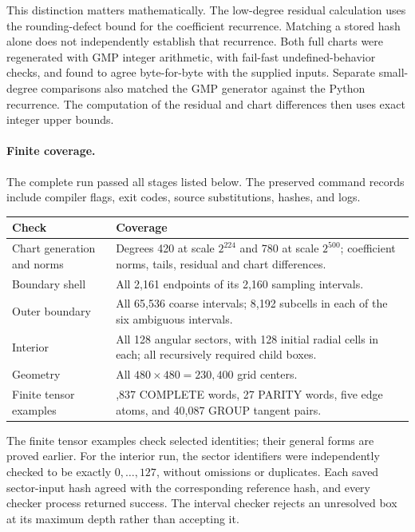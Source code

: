 \documentclass[11pt]{article}
\numberwithin{equation}{section}
\theoremstyle{definition}
\theoremstyle{remark}
\begin{document}
This distinction matters mathematically.  The low-degree residual calculation
uses the rounding-defect bound for the coefficient recurrence.  Matching a
stored hash alone does not independently establish that recurrence.  Both full
charts were regenerated with GMP integer arithmetic, with fail-fast
undefined-behavior checks, and found to agree
byte-for-byte with the supplied inputs.  Separate small-degree comparisons also
matched the GMP generator against the Python recurrence.  The computation of
the residual and chart differences then uses exact integer upper bounds.

\paragraph{Finite coverage.}
The complete run passed all stages listed below.  The preserved command records
include compiler flags, exit codes, source substitutions, hashes, and logs.
\begin{center}
\begin{tabular}{@{}>{\raggedright\arraybackslash}p{.29\linewidth}>{\raggedright\arraybackslash}p{.65\linewidth}@{}}
\toprule
Check & Coverage \\
\midrule
Chart generation and norms & Degrees 420 at scale $2^{224}$ and 780 at scale
$2^{500}$; coefficient norms, tails, residual and chart differences. \\
Boundary shell & All 2,161 endpoints of its 2,160 sampling intervals. \\
Outer boundary & All 65,536 coarse intervals; 8,192 subcells in each of the
six ambiguous intervals. \\
Interior & All 128 angular sectors, with 128 initial radial cells in each;
all recursively required child boxes. \\
Geometry & All $480\times480=230{,}400$ grid centers. \\
Finite tensor examples & 9,837 COMPLETE words, 27 PARITY words, five edge
atoms, and 40,087 GROUP tangent pairs. \\
\bottomrule
\end{tabular}
\end{center}
The finite tensor examples check selected identities; their general forms are
proved earlier.  For the interior run, the sector identifiers were independently
checked to be exactly $0,\ldots,127$, without omissions or duplicates.  Each saved
sector-input hash agreed with the corresponding reference hash, and every
checker process returned success.  The interval checker rejects an unresolved
box at its maximum depth rather than accepting it.
\end{document}
